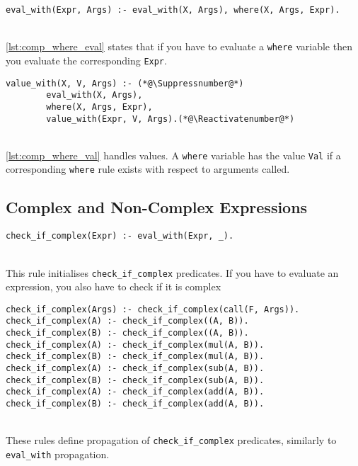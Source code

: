 \begin{lstlisting}[caption={Handling where evaluation}, label={lst:comp_where_eval}, firstnumber=76]
eval_with(Expr, Args) :- eval_with(X, Args), where(X, Args, Expr).
\end{lstlisting}
\mbox{} \\
\ref{lst:comp_where_eval} states that if you have to evaluate a \lstinline!where! variable then you evaluate the corresponding \lstinline!Expr!. \\
 
\begin{lstlisting}[caption={Handling where values}, label={lst:comp_where_val}, firstnumber=64]
value_with(X, V, Args) :- (*@\Suppressnumber@*)
		eval_with(X, Args), 
		where(X, Args, Expr), 
		value_with(Expr, V, Args).(*@\Reactivatenumber@*)
\end{lstlisting}
\mbox{} \\
\ref{lst:comp_where_val} handles values. A \lstinline!where! variable has the value \lstinline!Val! if a corresponding \lstinline!where! rule exists with respect to arguments called. \\

\subsection{Complex and Non-Complex Expressions}

\begin{lstlisting}
check_if_complex(Expr) :- eval_with(Expr, _).
\end{lstlisting}
\mbox{} \\
This rule initialises \lstinline{check_if_complex} predicates. If you have to evaluate an expression, you also have to check if it is complex \\%

\begin{lstlisting}
check_if_complex(Args) :- check_if_complex(call(F, Args)).
check_if_complex(A) :- check_if_complex((A, B)).
check_if_complex(B) :- check_if_complex((A, B)).
check_if_complex(A) :- check_if_complex(mul(A, B)).
check_if_complex(B) :- check_if_complex(mul(A, B)).
check_if_complex(A) :- check_if_complex(sub(A, B)).
check_if_complex(B) :- check_if_complex(sub(A, B)).
check_if_complex(A) :- check_if_complex(add(A, B)).
check_if_complex(B) :- check_if_complex(add(A, B)).
\end{lstlisting}
\mbox{} \\
These rules define propagation of \lstinline{check_if_complex} predicates, similarly to \lstinline{eval_with} propagation. \\

